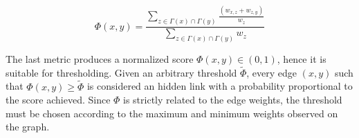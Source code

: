 \begin{equation}
\label{eqn:nta-local}
\Phi(x,y)=
\frac{\sum\limits_{z\in\Gamma(x)\cap\Gamma(y)}\frac{(w_{x,z}+w_{z,y})}{w_{z}}}
{\sum\limits_{z\in\Gamma(x)\cap\Gamma(y)}w_{z}}
\end{equation}

The last metric produces a normalized score $\Phi(x,y)\in(0,1)$, hence it is suitable for thresholding.
Given an arbitrary threshold $\tilde{\Phi}$, every edge $(x,y)$ such that $\Phi(x,y)\geq\tilde{\Phi}$ is considered an hidden link with a probability proportional to the score achieved.
Since $\Phi$ is strictly related to the edge weights, the threshold must be chosen according to the maximum and minimum weights observed on the graph. 






